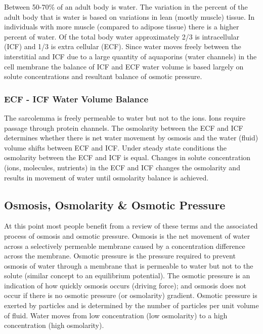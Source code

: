 Between 50-70\% of an adult body is water. The variation in the percent of the adult body that is water is based on variations in lean (mostly muscle) tissue. In individuals with more muscle (compared to adipose tissue) there is a higher percent of water. Of the total body water approximately 2/3 is intracellular (ICF) and 1/3 is extra cellular (ECF). Since water moves freely between the interstitial and ICF due to a large quantity of aquaporins (water channels) in the cell membrane the balance of ICF and ECF water volume is based largely on solute concentrations and resultant balance of osmotic pressure.

\subsubsection{ECF - ICF Water Volume Balance}

The sarcolemma is freely permeable to water but not to the ions. Ions require passage through protein channels. The osmolarity between the ECF and ICF determines whether there is net water movement by osmosis and the water (fluid) volume shifts between ECF and ICF. Under steady state conditions the osmolarity between the ECF and ICF is equal. Changes in solute concentration (ions, molecules, nutrients) in the ECF and ICF changes the osmolarity and results in movement of water until osmolarity balance is achieved.

\subsection{Osmosis, Osmolarity \& Osmotic Pressure}

At this point most people benefit from a review of these terms and the associated process of osmosis and osmotic pressure. Osmosis is the net movement of water across a selectively permeable membrane caused by a concentration difference across the membrane. Osmotic pressure is the pressure required to prevent osmosis of water through a membrane that is permeable to water but not to the solute (similar concept to an equilibrium potential). The osmotic pressure is an indication of how quickly osmosis occurs (driving force); and osmosis does not occur if there is no osmotic pressure (or osmolarity) gradient. Osmotic pressure is exerted by particles and is determined by the number of particles per unit volume of fluid. Water moves from low concentration (low osmolarity) to a high concentration (high osmolarity).


